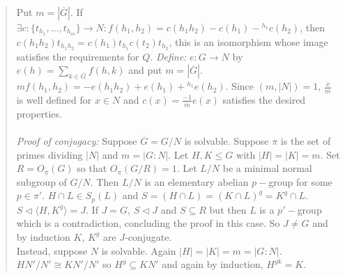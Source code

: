 \begin{quote}
Put $m= |\overline{G}|$.  If 
$\exists c:\{t_{h_1}, \ldots , t_{h_m}\} \rightarrow N: 
f(h_1 , h_2)= c(h_1 h_2) -c(h_1) - {^{h_1}} c(h_2)$, then
$c(h_1 h_2) t_{h_1 h_2}= c(h_1)t_{h_1} c(t_2) t_{h_2}$, this is an isomorphism
whose image satisfies the requirements for $Q$.  
\emph{Define:} $e: G \rightarrow N$ by
$e(h) = \sum_{k \in \overline{G}} f(h , k)$ and put $m= |\overline{G}|$.
$m f( h_1 , h_2 )=  -e(h_1 h_2) + e(h_1) + {^{h_1}}e(h_2)$.  Since $(m, |N|)=1$,
${\frac x m}$ is well defined for $ x \in N$ and
$c(x)= {\frac {-1} m} e(x)$ satisfies the desired properties.
\\
\\
\emph{Proof of conjugacy:}
Suppose $\overline{G}=G/N$ is solvable. Suppose $\pi$ is the set of primes 
dividing $|N|$ and $m=|G:N|$. Let $H,K \le G$ with $|H|=|K|=m$.  
Set $R=O_{\pi}(G)$ so that $O_{\pi}(G/R) = 1$.  
Let $L/N$ be a minimal
normal subgroup of $G/N$.
Then $L/N$ is an elementary abelian $p-$group for some $p \in \pi'$.
$H\cap L \in S_p(L)$ and
$S=(H \cap L)=(K \cap L)^g= K^g \cap L$.
$S \lhd \langle H, K^g \rangle = J$.  
If $J = G$, $S \lhd J$ and
$S \subseteq R$ but then $L$ is a $p'-$group which is a contradiction,
concluding the proof in this case.  So
$J \ne G$ and by induction $K$, $K^g$ are $J$-conjugate.  
\\
Instead, suppose
$N$ is solvable.  Again $|H|=|K|=m=|G:N|$.  
$HN'/N' \cong KN'/N'$ so $H^g \subseteq KN'$ and
again by induction, $H^{gk}= K$.
\end{quote}
